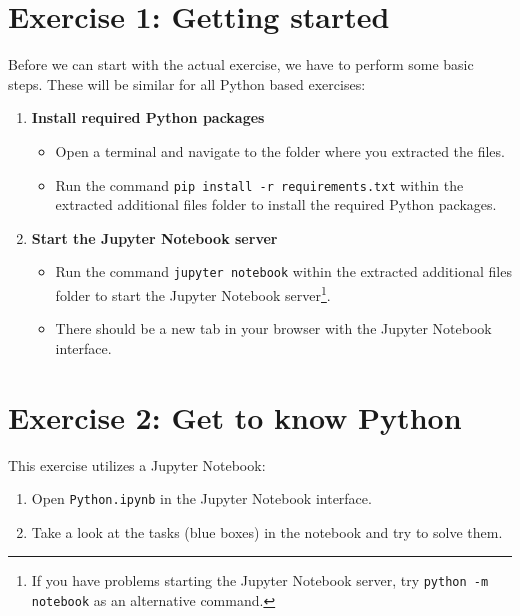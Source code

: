 \documentclass[
english,
smallborders
]{i6prcsht}
\begin{document}
\section*{Exercise 1: Getting started}

Before we can start with the actual exercise, we have to perform some basic steps. These will be similar for all Python based exercises:

\begin{enumerate}
	\item \textbf{Install required Python packages}
	      
	      \begin{itemize}
		      \item Open a terminal and navigate to the folder where you extracted the files.
		      \item Run the command \texttt{pip install -r requirements.txt} within the extracted additional files
		            folder to install the required Python packages.
	      \end{itemize}
	      
	\item \textbf{Start the Jupyter Notebook server}
	      
	      \begin{itemize}
		      \item Run the command \texttt{jupyter notebook} within the extracted additional files
		            folder to start the Jupyter Notebook server\footnote{If you have problems starting the Jupyter Notebook server, try \texttt{python -m notebook} as an alternative command.}.
		      \item There should be a new tab in your browser with the Jupyter Notebook interface.
	      \end{itemize}
\end{enumerate}

\section*{Exercise 2: Get to know Python}

This exercise utilizes a Jupyter Notebook:

\begin{enumerate}
	\item Open \texttt{Python.ipynb} in the Jupyter Notebook interface.
	\item Take a look at the tasks (blue boxes) in the notebook and try to solve them.
\end{enumerate}
\end{document}
